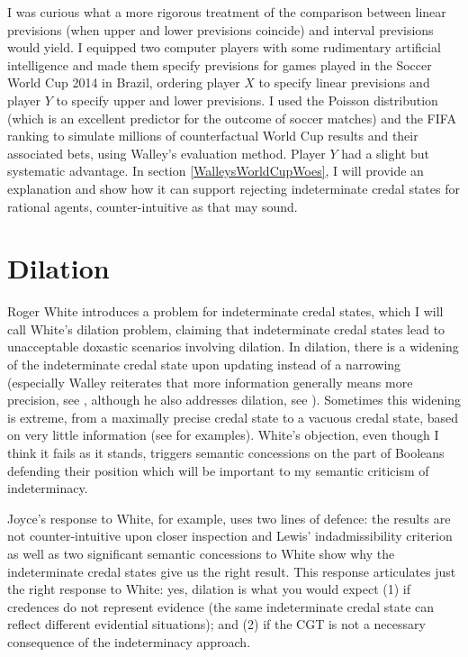 I was curious what a more rigorous treatment of the
comparison between linear previsions (when upper and
lower previsions coincide) and interval previsions
would yield. I equipped two computer players with some
rudimentary artificial intelligence and made them
specify previsions for games played in the Soccer World
Cup 2014 in Brazil, ordering player $X$ to specify
linear previsions and player $Y$ to specify upper and
lower previsions. I used the Poisson distribution
(which is an excellent predictor for the outcome of
soccer matches) and the FIFA ranking to simulate
millions of counterfactual World Cup results and their
associated bets, using Walley's evaluation method.
Player $Y$ had a slight but systematic advantage. In
section \ref{WalleysWorldCupWoes}, I will provide an
explanation and show how it can support rejecting
indeterminate credal states for rational agents,
counter-intuitive as that may sound.

\section{Dilation}
\label{Dilation}

Roger White introduces a problem for indeterminate
credal states, which I will call White's dilation
problem, claiming that indeterminate credal states lead
to unacceptable doxastic scenarios involving dilation.
In dilation, there is a widening of the indeterminate
credal state upon updating instead of a narrowing
(especially Walley reiterates that more information
generally means more precision, see
, although he also addresses
dilation, see ). Sometimes this
widening is extreme, from a maximally precise credal
state to a vacuous credal state, based on very little
information (see  for examples).
White's objection, even though I think it fails as it
stands, triggers semantic concessions on the part of
Booleans defending their position which will be
important to my semantic criticism of indeterminacy.

Joyce's response to White, for example, uses two lines
of defence: the results are not counter-intuitive upon
closer inspection and Lewis' indadmissibility criterion
as well as two significant semantic concessions to
White show why the indeterminate credal states give us
the right result. This response articulates just the
right response to White: yes, dilation is what you
would expect (1) if credences do not represent evidence
(the same indeterminate credal state can reflect
different evidential situations); and (2) if the CGT is
not a necessary consequence of the indeterminacy
approach.

